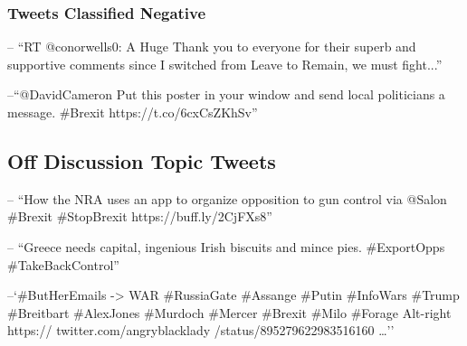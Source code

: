 \documentclass[11pt]{report}
\begin{document}
\subsubsection*{Tweets Classified Negative}
-- ``RT @conorwells0: A Huge Thank you to everyone for their superb and supportive comments since I switched from Leave to Remain, we must fight...''

--``@David\textunderscore Cameron Put this poster in your window and send local politicians a message. \#Brexit https://t.co/6cxCsZKhSv''


\subsection*{Off Discussion Topic Tweets}
-- ``How the NRA uses an app to organize opposition to gun control via @Salon \#Brexit \#StopBrexit https://buff.ly/2CjFXs8''

-- ``Greece needs capital, ingenious Irish biscuits and mince pies. \#ExportOpps \#TakeBackControl''

--`\#ButHerEmails -> WAR \#RussiaGate \#Assange \#Putin \#InfoWars \#Trump \#Breitbart \#AlexJones \#Murdoch \#Mercer \#Brexit \#Milo \#Forage Alt-right https:// twitter.com/angryblacklady /status/895279622983516160 …''
\end{document}
